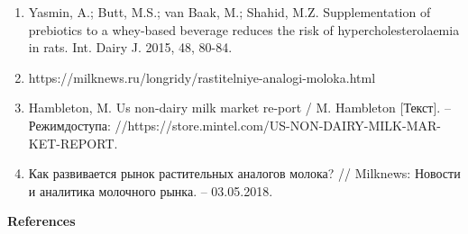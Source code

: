 \begin{enumerate}
\item
Yasmin, A.; Butt, M.S.; van Baak, M.; Shahid, M.Z. Supplementation of
prebiotics to a whey-based beverage reduces the risk of
hypercholesterolaemia in rats. Int. Dairy J. 2015, 48, 80-84.

\item
https://milknews.ru/longridy/rastitelniye-analogi-moloka.html

\item
Hambleton, M. Us non-dairy milk market re-port / M. Hambleton
{[}Текст{]}. -- Режимдоступа:
//https://store.mintel.com/US-NON-DAIRY-MILK-MAR-KET-REPORT.

\item
Как развивается рынок растительных аналогов молока? // Milknews:
Новости и аналитика молочного рынка. -- 03.05.2018.
\end{enumerate}

{\bfseries References}

